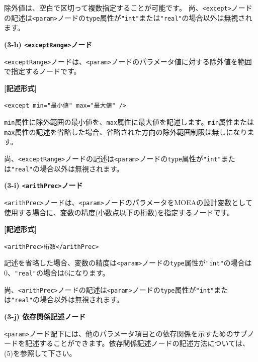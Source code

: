 \documentclass[a4paper,11pt]{jarticle}
\begin{document}
{\vspace{8pt}
\leftskip=0pt
除外値は、空白で区切って複数指定することが可能です。
尚、\texttt{<except>}ノードの記述は\texttt{<param>}ノードの{\tt type}属性が\texttt{"int"}または\texttt{"real"}の場合以外は無視されます。

\vspace{12pt}
\textbf{(3-h) \texttt{<exceptRange>}ノード}

\texttt{<exceptRange>}ノードは、\texttt{<param>}ノードのパラメータ値に対する除外値を範囲で指定するノードです。

\vspace{8pt}
\leftskip=12pt
\textbf{[記述形式]}

\leftskip=42pt
\texttt{<except  min="最小値"  max="最大値" />}

\vspace{8pt}
\leftskip=0pt
{\tt min}属性に除外範囲の最小値を、{\tt max}属性に最大値を記述します。{\tt min}属性または{\tt max}属性の記述を省略した場合、省略された方向の除外範囲制限は無しになります。

尚、\texttt{<exceptRange>}ノードの記述は\texttt{<param>}ノードの{\tt type}属性が\texttt{"int"}または\texttt{"real"}の場合以外は無視されます。

\vspace{12pt}
\textbf{(3-i) \texttt{<arithPrec>}ノード}

\texttt{<arithPrec>}ノードは、\texttt{<param>}ノードのパラメータをMOEAの設計変数として使用する場合に、変数の精度(小数点以下の桁数)を指定するノードです。

\vspace{8pt}
\leftskip=12pt
\textbf{[記述形式]}

\leftskip=42pt
\texttt{<arithPrec>桁数</arithPrec>}

\vspace{8pt}
\leftskip=0pt
記述を省略した場合、変数の精度は\texttt{<param>}ノードの{\tt type}属性が\texttt{"int"}の場合は0、\texttt{"real"}の場合は6になります。

尚、\texttt{<arithPrec>}ノードの記述は\texttt{<param>}ノードの{\tt type}属性が\texttt{"int"}または\texttt{"real"}の場合以外は無視されます。

\vspace{12pt}
\textbf{(3-j) 依存関係記述ノード}

\texttt{<param>}ノード配下には、他のパラメータ項目との依存関係を示すためのサブノードを記述することができます。依存関係記述ノードの記述方法については、(5)を参照して下さい。

}
\end{document}
